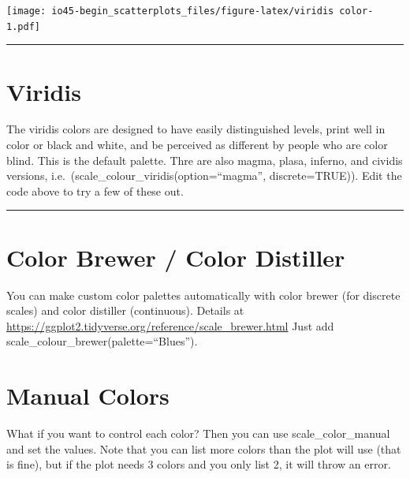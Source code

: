 \documentclass[
]{book}
\begin{document}
\texttt{[image: io45-begin\_scatterplots\_files/figure-latex/viridis color-1.pdf]}

\begin{center}\rule{0.5\linewidth}{0.5pt}\end{center}

\hypertarget{viridis}{%
\chapter{Viridis}\label{viridis}}

The viridis colors are designed to have easily distinguished levels, print well in color or black and white, and be perceived as different by people who are color blind. This is the default palette. Thre are also magma, plasa, inferno, and cividis versions, i.e.~(scale\_colour\_viridis(option=``magma'', discrete=TRUE)). Edit the code above to try a few of these out.

\begin{center}\rule{0.5\linewidth}{0.5pt}\end{center}

\hypertarget{color-brewer-color-distiller}{%
\chapter{Color Brewer / Color Distiller}\label{color-brewer-color-distiller}}

You can make custom color palettes automatically with color brewer (for discrete scales) and color distiller (continuous). Details at \url{https://ggplot2.tidyverse.org/reference/scale_brewer.html}
Just add scale\_colour\_brewer(palette=``Blues'').

\hypertarget{manual-colors}{%
\chapter{Manual Colors}\label{manual-colors}}

What if you want to control each color? Then you can use scale\_color\_manual and set the values. Note that you can list more colors than the plot will use (that is fine), but if the plot needs 3 colors and you only list 2, it will throw an error.
\end{document}
